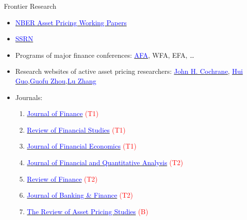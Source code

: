 \documentclass{beamer}
\begin{document}
\begin{frame}{Frontier Research}
	\begin{itemize}
		\item \href{https://www.nber.org/programs-projects/programs-working-groups/asset-pricing}{\textcolor{blue}{NBER Asset Pricing Working Papers}}
		\item \href{https://papers.ssrn.com/sol3/DisplayAbstractSearch.cfm}{\textcolor{blue}{SSRN}}
		\item Programs of major finance conferences: \href{https://editorialexpress.com/conference/AFA2022/program/AFA2022.html}{\textcolor{blue}{AFA}}, WFA, EFA, …
		\item Research websites of active asset pricing researchers: \href{https://www.johnhcochrane.com/}{\textcolor{blue}{John H. Cochrane}}, \href{http://homepages.uc.edu/~guohu/}{\textcolor{blue}{Hui Guo}},\href{https://apps.olin.wustl.edu/faculty/zhou/}{\textcolor{blue}{Guofu Zhou}},\href{https://theinvestmentcapm.com/index.html}{\textcolor{blue}{Lu Zhang}}
		\item Journals:
          \begin{enumerate}
              \item \href{https://onlinelibrary.wiley.com/journal/15406261}{\textcolor{blue}{Journal of Finance}} \textcolor{red}{(T1)}
              \item \href{https://academic.oup.com/rfs/issue}{\textcolor{blue}{Review of Financial Studies}} \textcolor{red}{(T1)}
              \item \href{https://www.sciencedirect.com/journal/journal-of-financial-economics}{\textcolor{blue}{Journal of Financial Economics}} \textcolor{red}{(T1)}
              \item \href{https://www.cambridge.org/core/journals/journal-of-financial-and-quantitative-analysis}{\textcolor{blue}{Journal of Financial and Quantitative Analysis}} \textcolor{red}{(T2)}
              \item \href{https://academic.oup.com/rof}{\textcolor{blue}{Review of Finance}} \textcolor{red}{(T2)}
              \item \href{https://www.sciencedirect.com/journal/journal-of-banking-and-finance}{\textcolor{blue}{Journal of Banking \& Finance}} \textcolor{red}{(T2)}
              \item \href{https://academic.oup.com/raps/issue}{\textcolor{blue}{The Review of Asset Pricing Studies}} \textcolor{red}{(B)}
          \end{enumerate}
	\end{itemize}
\end{frame}
\end{document}
